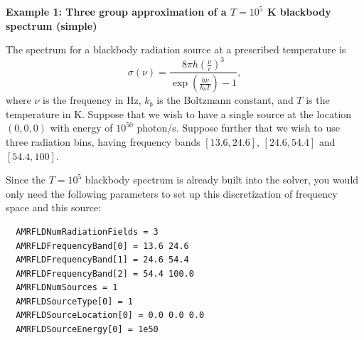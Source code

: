 \documentclass[10pt]{article}
\renewcommand{\(}{\left(}
\renewcommand{\)}{\right)}
\begin{document}
\begin{shaded}
{\bf Example 1:  Three group approximation of a $T=10^5$ K blackbody
  spectrum (simple)}

The spectrum for a blackbody radiation source at a prescribed
temperature is 
\[
   \sigma(\nu) = \frac{8\pi h \left(\frac{\nu}{c}\right)^3}{\exp\left(\frac{h\nu}{k_b T}\right)-1},
\]
where $\nu$ is the frequency in Hz, $k_b$ is the Boltzmann constant,
and $T$ is the temperature in K.  Suppose that we wish to have a
single source at the location $(0,0,0)$ with energy of $10^{50}$
photon/s.  Suppose further that we wish to use three radiation bins,
having frequency bands $[13.6, 24.6]$, $[24.6, 54.4]$ and $[54.4, 100]$. 

Since the $T=10^5$ blackbody spectrum is already built into the
solver, you would only need the following parameters to set up this
discretization of frequency space and this source: 
\begin{verbatim}
  AMRFLDNumRadiationFields = 3
  AMRFLDFrequencyBand[0] = 13.6 24.6
  AMRFLDFrequencyBand[1] = 24.6 54.4
  AMRFLDFrequencyBand[2] = 54.4 100.0
  AMRFLDNumSources = 1
  AMRFLDSourceType[0] = 1
  AMRFLDSourceLocation[0] = 0.0 0.0 0.0
  AMRFLDSourceEnergy[0] = 1e50
\end{verbatim}
\end{shaded}
\end{document}
